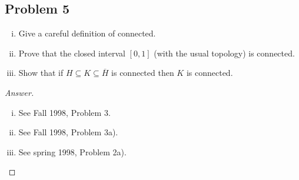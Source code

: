 \documentclass[12pt]{article}
\theoremstyle{definition}
\begin{document}
\subsection{Problem 5}
\begin{enumerate}[(i)]
    \item Give a careful definition of connected.
    \item Prove that the closed interval $[0,1]$ (with the usual topology) is connected.
    \item Show that if $H \subseteq K \subseteq \overline{H}$ is connected then $K$ is connected.
\end{enumerate}
\begin{proof}[Answer]
    \noindent
    \begin{enumerate}[(i)]
        \item See Fall 1998, Problem 3.
        \item See Fall 1998, Problem 3a).
        \item See spring 1998, Problem 2a).
    \end{enumerate}
\end{proof}
\end{document}
